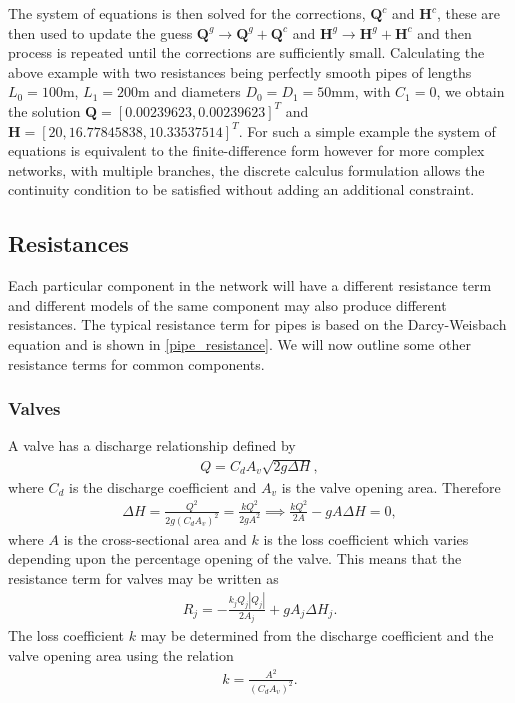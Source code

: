 \documentclass[12pt]{article}
\begin{document}
The system of equations is then solved for the corrections, $\mathbf{Q}^c$ and $\mathbf{H}^c$, these are then used to update the guess $\mathbf{Q}^g \rightarrow \mathbf{Q}^g + \mathbf{Q}^c $ and $\mathbf{H}^g \rightarrow \mathbf{H}^g + \mathbf{H}^c $ and then process is repeated until the corrections are sufficiently small. Calculating the above example with two resistances being perfectly smooth pipes of lengths $L_0 = 100$m, $L_1 = 200$m and diameters $D_0=D_1=50$mm, with $C_1=0$, we obtain the solution $\mathbf{Q} = [0.00239623, 0.00239623]^T$ and $\mathbf{H} = [20, 16.77845838, 10.33537514]^T$. For such a simple example the system of equations is equivalent to the finite-difference form however for more complex networks, with multiple branches, the discrete calculus formulation allows the continuity condition to be satisfied without adding an additional constraint. 

\subsection{Resistances}

Each particular component in the network will have a different resistance term and different models of the same component may also produce different resistances. The typical resistance term for pipes is based on the Darcy-Weisbach equation and is shown in \eqref{pipe_resistance}. We will now outline some other resistance terms for common components. 

\subsubsection{Valves}

A valve has a discharge relationship defined by 
\begin{align}
Q = C_d A_v \sqrt{2 g \Delta H},
\end{align}
where $C_d$ is the discharge coefficient and $A_v$ is the valve opening area. {\color{green} Therefore 
\begin{align}
\Delta H = \frac{Q^2}{2g\left(C_d A_v \right)^2} = \frac{k Q^2}{2 g A^2} \implies \frac{k Q^2}{2A} - g A \Delta H = 0,
\end{align}
where $A$ is the cross-sectional area and $k$ is the loss coefficient which varies depending upon the percentage opening of the valve. This means that the resistance term for valves may be written as
\begin{align} \label{valve_resistance}
\boxed{ R_j = - \frac{k_j Q_j|Q_j| }{2 A_j} + g A_j \Delta H_j. }
\end{align}}
The loss coefficient $k$ may be determined from the discharge coefficient and the valve opening area using the relation 
\begin{align}
k = \frac{A^2}{\left(C_d A_v \right)^2}.
\end{align}
\end{document}
